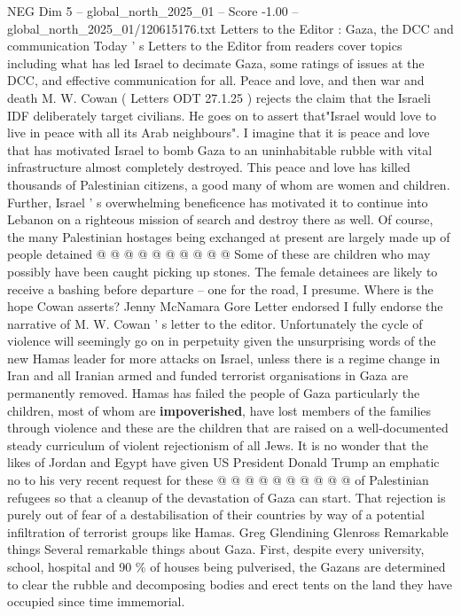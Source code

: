 \begin{textsample}{NEG Dim 5 – global\_north\_2025\_01 – Score -1.00 – global\_north\_2025\_01/120615176.txt}  \label{ex:f5_neg_072}
Letters to the Editor : Gaza, the DCC and communication Today ' s Letters to the Editor from readers cover topics including what has led Israel to decimate Gaza, some ratings of issues at the DCC, and effective communication for all.
Peace and love, and then war and death M.
W.
Cowan ( Letters ODT 27.1.25 ) rejects the claim that the Israeli IDF deliberately target civilians.
He goes on to assert that"Israel would love to live in peace with all its Arab neighbours".
I imagine that it is peace and love that has motivated Israel to bomb Gaza to an uninhabitable rubble with vital infrastructure almost completely destroyed.
This peace and love has killed thousands of Palestinian citizens, a good many of whom are women and children.
Further, Israel ' s overwhelming beneficence has motivated it to continue into Lebanon on a righteous mission of search and destroy there as well.
Of course, the many Palestinian hostages being exchanged at present are largely made up of people detained @ @ @ @ @ @ @ @ @ @ Some of these are children who may possibly have been caught picking up stones.
The female detainees are likely to receive a bashing before departure -- one for the road, I presume.
Where is the hope Cowan asserts?
Jenny McNamara Gore Letter endorsed I fully endorse the narrative of M.
W.
Cowan ' s letter to the editor.
Unfortunately the cycle of violence will seemingly go on in perpetuity given the unsurprising words of the new Hamas leader for more attacks on Israel, unless there is a regime change in Iran and all Iranian armed and funded terrorist organisations in Gaza are permanently removed.
Hamas has failed the people of Gaza particularly the children, most of whom are \textbf{impoverished}, have lost members of the families through violence and these are the children that are raised on a well-documented steady curriculum of violent rejectionism of all Jews.
It is no wonder that the likes of Jordan and Egypt have given US President Donald Trump an emphatic no to his very recent request for these @ @ @ @ @ @ @ @ @ @ of Palestinian refugees so that a cleanup of the devastation of Gaza can start.
That rejection is purely out of fear of a destabilisation of their countries by way of a potential infiltration of terrorist groups like Hamas.
Greg Glendining Glenross Remarkable things Several remarkable things about Gaza.
First, despite every university, school, hospital and 90 \% of houses being pulverised, the Gazans are determined to clear the rubble and decomposing bodies and erect tents on the land they have occupied since time immemorial.

\end{textsample}

